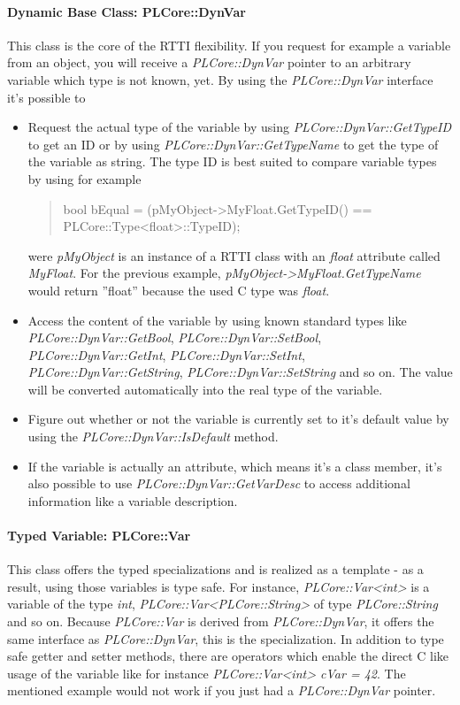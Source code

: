 \paragraph{Dynamic Base Class: PLCore::DynVar}
This class is the core of the \ac{RTTI} flexibility. If you request for example a variable from an object, you will receive a \emph{PLCore::DynVar} pointer to an arbitrary variable which type is not known, yet. By using the \emph{PLCore::DynVar} interface it's possible to
\begin{itemize}
\item{Request the actual type of the variable by using \emph{PLCore::DynVar::GetTypeID} to get an ID or by using \emph{PLCore::DynVar::GetTypeName} to get the type of the variable as string. The type ID is best suited to compare variable types by using for example \begin{quote}bool bEqual = (pMyObject->MyFloat.GetTypeID() == PLCore::Type<float>::TypeID);\end{quote} were \emph{pMyObject} is an instance of a \ac{RTTI} class with an \emph{float} attribute called \emph{MyFloat}. For the previous example, \emph{pMyObject->MyFloat.GetTypeName} would return ''float'' because the used C type was \emph{float}.}
\item{Access the content of the variable by using known standard types like \emph{PLCore::DynVar::GetBool}, \emph{PLCore::DynVar::SetBool}, \emph{PLCore::DynVar::GetInt}, \emph{PLCore::DynVar::SetInt}, \emph{PLCore::DynVar::GetString}, \emph{PLCore::DynVar::SetString} and so on. The value will be converted automatically into the real type of the variable.}
\item{Figure out whether or not the variable is currently set to it's default value by using the \emph{PLCore::DynVar::IsDefault} method.}
\item{If the variable is actually an attribute, which means it's a class member, it's also possible to use \emph{PLCore::DynVar::GetVarDesc} to access additional information like a variable description.}
\end{itemize}


\paragraph{Typed Variable: PLCore::Var}
This class offers the typed specializations and is realized as a template - as a result, using those variables is type safe. For instance, \emph{PLCore::Var<int>} is a variable of the type \emph{int}, \emph{PLCore::Var<PLCore::String>} of type \emph{PLCore::String} and so on. Because \emph{PLCore::Var} is derived from \emph{PLCore::DynVar}, it offers the same interface as \emph{PLCore::DynVar}, this is the specialization. In addition to type safe getter and setter methods, there are operators which enable the direct C like usage of the variable like for instance \emph{PLCore::Var<int> cVar = 42}. The mentioned example would not work if you just had a \emph{PLCore::DynVar} pointer.


